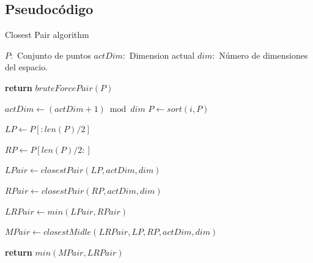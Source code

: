 \documentclass{article}
\begin{document}
	\subsection{Pseudocódigo}
		\begin{algorithm}[H]

			\caption{Closest Pair algorithm}

			\label{euclid}

			\begin{algorithmic}[1] %

				\State $P:$ Conjunto de puntos
				\State $actDim:$ Dimension actual
				\State $dim:$ Número de dimensiones del espacio.
				\State
			
					
					\State \textbf{return}  $bruteForcePair(P)$ 
				\Else
					
					\State $actDim\gets(actDim+1) \bmod dim$ 	
					\State $P \gets sort(i, P)$
					
					\State
					
					\State $LP \gets P[:len(P)/2]$
					
					\State $RP \gets P[len(P)/2:]$
					
					\State
					
					\State $LPair \gets closestPair(LP, actDim, dim)$
					
					\State $RPair \gets closestPair(RP, actDim, dim)$
					
					\State $LRPair \gets min(LPair, RPair)$
					
					\State
					
					\State $MPair \gets closestMidle(LRPair, LP, RP, actDim, dim)$
					
					\State

					\State \textbf{return} $min(MPair, LRPair)$
	
				\EndIf
			
			\EndProcedure

			\end{algorithmic}

		\end{algorithm}
		
\end{document}

